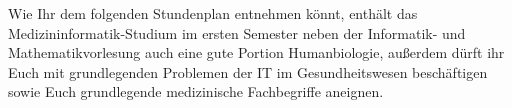 Wie Ihr dem folgenden Stundenplan entnehmen könnt, enthält das Medizininformatik-Studium im ersten Semester neben der Informatik- und Mathematikvorlesung auch eine gute Portion Humanbiologie, außerdem dürft ihr Euch mit grundlegenden Problemen der IT im Gesundheitswesen beschäftigen sowie Euch grundlegende medizinische Fachbegriffe aneignen.\\
\noindent{}

